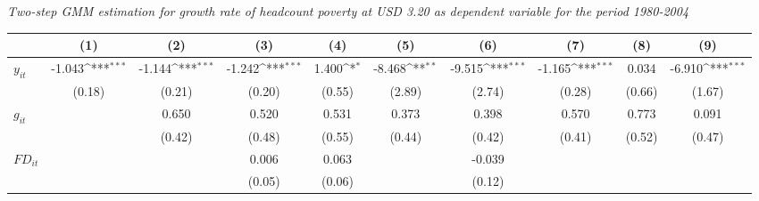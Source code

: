 \documentclass[12pt, a4paper]{article}
\begin{document}
\begin{table}
\begin{threeparttable}
\begin{tablenotes}
		\end{tablenotes}
	\end{threeparttable}
	\caption[Two-Step System-GMM Estimation Results for Headcount Poverty at USD 3.20 for 1980-2004]{\textit{Two-step GMM estimation for growth rate of headcount poverty at USD 3.20 as dependent variable for the period 1980-2004}}
	\label{2GMM3202005}
\end{table}

	\begin{table}
	\centering
	\scriptsize
	\setlength\tabcolsep{1pt}	
	\begin{threeparttable}
		{
			\def\sym#1{\ifmmode^{#1}\else\(^{#1}\)\fi}
			\begin{tabular}{l*{9}{c}}
				\hline\hline
				&\multicolumn{1}{c}{(1)}&\multicolumn{1}{c}{(2)}&\multicolumn{1}{c}{(3)}&\multicolumn{1}{c}{(4)}&\multicolumn{1}{c}{(5)}&\multicolumn{1}{c}{(6)}&\multicolumn{1}{c}{(7)}&\multicolumn{1}{c}{(8)}&\multicolumn{1}{c}{(9)}\\
				\hline
				$y_{it}$               &      -1.043\sym{***}&      -1.144\sym{***}&      -1.242\sym{***}&       1.400\sym{*}  &      -8.468\sym{**} &      -9.515\sym{***}&      -1.165\sym{***}&       0.034         &      -6.910\sym{***}\\
				&      (0.18)         &      (0.21)         &      (0.20)         &      (0.55)         &      (2.89)         &      (2.74)         &      (0.28)         &      (0.66)         &      (1.67)         \\
				$g_{it}$             &                     &       0.650         &       0.520         &       0.531         &       0.373         &       0.398         &       0.570         &       0.773         &       0.091         \\
				&                     &      (0.42)         &      (0.48)         &      (0.55)         &      (0.44)         &      (0.42)         &      (0.41)         &      (0.52)         &      (0.47)         \\
				$FD_{it}$                &                     &                     &       0.006         &       0.063         &                     &      -0.039         &                     &                     &                     \\
				&                     &                     &      (0.05)         &      (0.06)         &                     &      (0.12)         &                     &                     &                     \\

\end{tabular}}
\end{threeparttable}
\end{table}
\end{document}
